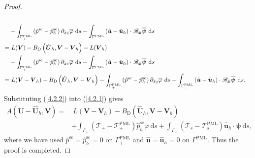 \documentclass[final,3p,times]{elsarticle}
\begin{document}
\begin{proof}
\begin{align}
		\notag\\
		&-\int_{\Gamma_+^\mathrm{PML}}\left(\hat{p}^{\mathrm{sc}}-\hat{p}^{\mathrm{sc}}_h\right) \partial_{\hat{x}_2} \overline{\varphi} \mathrm{~d} s
		- \int_{\Gamma_-^\mathrm{PML}} \left(\hat{\boldsymbol{u}}-\hat{\boldsymbol{u}}_h\right) \cdot \mathscr{B}_{\hat{\boldsymbol{x}}} \overline{\boldsymbol{\psi}} \mathrm{~d} s \notag\\
		=& ~L(\boldsymbol{V}) - B_\mathrm{D}\left(\hat{\boldsymbol{U}}_h, \boldsymbol{V}-\boldsymbol{V}_h\right)- L(\boldsymbol{V}_h)
		\notag\\
		&-\int_{\Gamma_+^\mathrm{PML}}\left(\hat{p}^{\mathrm{sc}}-\hat{p}^{\mathrm{sc}}_h\right) \partial_{\hat{x}_2} \overline{\varphi} \mathrm{~d} s
		- \int_{\Gamma_-^\mathrm{PML}} \left(\hat{\boldsymbol{u}}-\hat{\boldsymbol{u}}_h\right) \cdot \mathscr{B}_{\hat{\boldsymbol{x}}} \overline{\boldsymbol{\psi}} \mathrm{~d} s \notag\\
		=&~ L(\boldsymbol{V}-\boldsymbol{V}_h)
		-B_\mathrm{D}\left(\hat{\boldsymbol{U}}_h,\boldsymbol{V}-\boldsymbol{V}_h\right)
		-\int_{\Gamma_+^\mathrm{PML}}\left(\hat{p}^{\mathrm{sc}}-\hat{p}^{\mathrm{sc}}_h\right) \partial_{\hat{x}_2} \overline{\varphi} \mathrm{~d} s
		- \int_{\Gamma_-^\mathrm{PML}} \left(\hat{\boldsymbol{u}}-\hat{\boldsymbol{u}}_h\right) \cdot \mathscr{B}_{\hat{\boldsymbol{x}}} \overline{\boldsymbol{\psi}} \mathrm{~d} s.
	\end{align}
	Substituting (\ref{4.2.2}) into (\ref{4.2.1}) gives
	\begin{align*}
		A\left(\boldsymbol{U}-\hat{\boldsymbol{U}}_{h}, \boldsymbol{V}\right)=&~ L(\boldsymbol{V}-\boldsymbol{V}_h)
		-B_\mathrm{D}\left(\hat{\boldsymbol{U}}_h,\boldsymbol{V}-\boldsymbol{V}_h\right) \\
		&+ \int_{\Gamma_+}\left(\mathscr{T}_+-\mathscr{T}_+^{\mathrm{PML}}\right)\hat{p}^{\mathrm{sc}}_h \overline{\varphi} \mathrm{~d} s
		+\int_{\Gamma_-}\left(\mathscr{T}_s-\mathscr{T}_s^{\mathrm{PML}}\right)\hat{\boldsymbol{u}}_h \cdot \overline{\boldsymbol{\psi}} \mathrm{~d} s,
	\end{align*}
	where we have used $\hat{p}^{\mathrm{sc}}=\hat{p}^{\mathrm{sc}}_h=0$ on $\Gamma_+^{\mathrm{PML}}$ and $\hat{\boldsymbol{u}}=\hat{\boldsymbol{u}}_h=0$ on $\Gamma_-^{\mathrm{PML}}$. Thus the proof is completed.
\end{proof}
\end{document}
